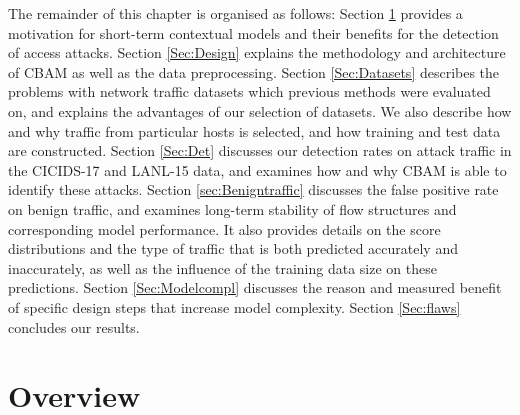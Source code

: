 The remainder of this chapter is organised as follows:
Section \ref{Sec:Over} provides a motivation for short-term contextual models and their benefits for the detection of access attacks. Section \ref{Sec:Design} explains the methodology and architecture of CBAM  as well as the data preprocessing. Section \ref{Sec:Datasets} describes the problems with network traffic datasets which previous methods were evaluated on, and explains the advantages of our selection of datasets. 
We also describe how and why traffic from particular hosts is selected, and how training and test data are constructed.
Section \ref{Sec:Det} discusses our detection rates on attack traffic in the CICIDS-17 and LANL-15 data, and examines how and why CBAM is able to identify these attacks.
Section \ref{sec:Benigntraffic} discusses the false positive rate on benign traffic, and examines long-term stability of flow structures and corresponding model performance. It also provides details on the score distributions and the type of traffic that is both predicted accurately and inaccurately, as well as the influence of the training data size on these predictions.
Section \ref{Sec:Modelcompl} discusses the reason and measured benefit of specific design steps that increase model complexity.
Section \ref{Sec:flaws} concludes our results.%


\section{Overview}\label{Sec:Over}


